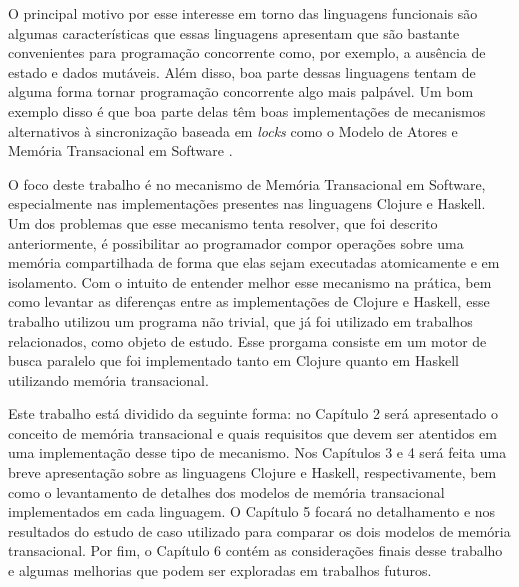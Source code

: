 O principal motivo por esse interesse em torno das linguagens funcionais são algumas características que essas linguagens apresentam que são bastante convenientes para programação concorrente como, por exemplo, a ausência de estado e dados mutáveis. Além disso, boa parte dessas linguagens tentam de alguma forma tornar programação concorrente algo mais palpável. Um bom exemplo disso é que boa parte delas têm boas implementações de mecanismos alternativos à sincronização baseada em \emph{locks} como o Modelo de Atores \cite{agha1986actors} e Memória Transacional em Software \cite{shavit1995software}.

O foco deste trabalho é no mecanismo de Memória Transacional em Software, especialmente nas implementações presentes nas linguagens Clojure e Haskell. Um dos problemas que esse mecanismo  tenta resolver, que foi descrito anteriormente, é possibilitar ao programador compor operações sobre uma memória compartilhada de forma que elas sejam executadas atomicamente e em isolamento. Com o intuito de entender melhor esse mecanismo na prática, bem como levantar as diferenças entre as implementações de Clojure e Haskell, esse trabalho utilizou um programa não trivial, que já foi utilizado em trabalhos relacionados, como objeto de estudo. Esse prorgama consiste em um motor de busca paralelo que foi implementado tanto em Clojure quanto em Haskell utilizando memória transacional. 

Este trabalho está dividido da seguinte forma: no Capítulo 2 será apresentado o conceito de memória transacional e quais requisitos que devem ser atentidos em uma implementação desse tipo de mecanismo. Nos Capítulos 3 e 4 será feita uma breve apresentação sobre as linguagens Clojure e Haskell, respectivamente, bem como o levantamento de detalhes dos modelos de memória transacional implementados em cada linguagem. O Capítulo 5 focará no detalhamento e nos resultados do estudo de caso utilizado para comparar os dois modelos de memória transacional. Por fim, o Capítulo 6 contém as considerações finais desse trabalho e algumas melhorias que podem ser exploradas em trabalhos futuros.